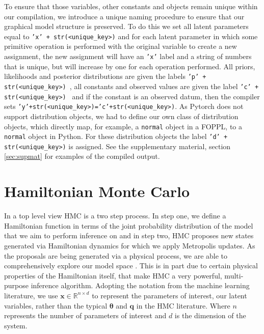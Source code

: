 \documentclass[twoside]{article}
\begin{document}
To ensure that those variables, other constants and objects remain unique within our compilation, we introduce a unique naming procedure to ensure that our graphical model structure is preserved.  To do this we set all latent parameters equal to \texttt{'x' + str(<unique_key>)} and for each latent parameter in which some primitive operation is performed with the original variable to create a new assignment, the new assignment will have an \texttt{'x'} label and a string of numbers that is unique, but will increase by one for each operation performed. All priors, likelihoods and posterior distributions are given the labels \texttt{'p' + str(<unique_key>) }, all constants and observed values are given the label \texttt{'c' + str(<unique_key>) } and if the constant is an observed datum, then the compiler sets  \texttt{'y'+str(<unique_key>)='c'+str(<unique_key>)}. As Pytorch does not support distribution objects, we had to define our own class of distribution objects, which directly map, for example, a \texttt{normal} object in a FOPPL, to a \texttt{normal} object in Python. For these distribution objects the label \texttt{'d' + str(<unique_key>)} is assigned. See the supplementary material, section \ref{sec:supmat} for examples of the compiled output.

\section{Hamiltonian Monte Carlo}
\label{sec:hmc}
In a top level view HMC is a two step process. In step one, we define a Hamiltonian function in terms of the joint probability distribution of the model that we aim to perform inference on and in step two, HMC proposes new states generated via Hamiltonian dynamics for which we apply Metropolis updates. As the proposals are being generated via a physical process, we are able to comprehensively explore our model space \citep{neal2011mcmc}. This is in part due to certain physical properties of the Hamiltonian itself, that make HMC a very powerful, multi-purpose inference algorithm. Adopting the notation from the machine learning literature, we use $\textbf{x} \in \mathbb{R}^{n \times d}$ to represent the parameters of interest, our latent variables, rather than the typical $\mathbf{\theta}$ and $\textbf{q}$ in the HMC literature. Where $n$ represents the number of parameters of interest and $d$ is the dimension of the system.
\end{document}
